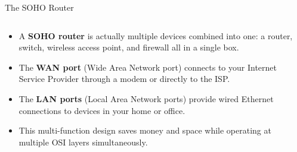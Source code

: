 \documentclass[aspectratio=169]{beamer}
\begin{document}
\begin{frame}{The SOHO Router}

\begin{columns}
\begin{column}{0.55\textwidth}
\begin{itemize}
    \item A \textbf{SOHO router} is actually multiple devices combined into one: a router, switch, wireless access point, and firewall all in a single box.
    \item The \textbf{WAN port} (Wide Area Network port) connects to your Internet Service Provider through a modem or directly to the ISP.
    \item The \textbf{LAN ports} (Local Area Network ports) provide wired Ethernet connections to devices in your home or office.
    \item This multi-function design saves money and space while operating at multiple OSI layers simultaneously.
\end{itemize}
\end{column}

\begin{column}{0.4\textwidth}
\centering
{}
\end{column}
\end{columns}

\end{frame}
\end{document}
